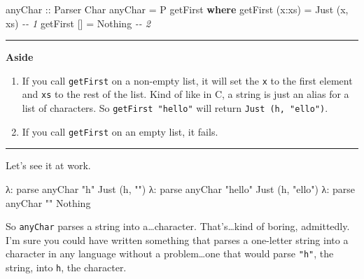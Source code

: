 \documentclass[]{article}
\newenvironment{Shaded}{}{}
\newcommand{\CharTok}[1]{\textcolor[rgb]{0.25,0.44,0.63}{#1}}
\newcommand{\CommentTok}[1]{\textcolor[rgb]{0.38,0.63,0.69}{\textit{#1}}}
\newcommand{\DataTypeTok}[1]{\textcolor[rgb]{0.56,0.13,0.00}{#1}}
\newcommand{\KeywordTok}[1]{\textcolor[rgb]{0.00,0.44,0.13}{\textbf{#1}}}
\newcommand{\NormalTok}[1]{#1}
\newcommand{\OperatorTok}[1]{\textcolor[rgb]{0.40,0.40,0.40}{#1}}
\newcommand{\OtherTok}[1]{\textcolor[rgb]{0.00,0.44,0.13}{#1}}
\newcommand{\StringTok}[1]{\textcolor[rgb]{0.25,0.44,0.63}{#1}}
\begin{document}
\begin{Shaded}
\begin{Highlighting}[]
\OtherTok{anyChar ::} \DataTypeTok{Parser} \DataTypeTok{Char}
\NormalTok{anyChar }\OtherTok{=} \DataTypeTok{P}\NormalTok{ getFirst}
    \KeywordTok{where}
\NormalTok{        getFirst (x}\OperatorTok{:}\NormalTok{xs) }\OtherTok{=} \DataTypeTok{Just}\NormalTok{ (x, xs)          }\CommentTok{{-}{-} 1}
\NormalTok{        getFirst []     }\OtherTok{=} \DataTypeTok{Nothing}               \CommentTok{{-}{-} 2}
\end{Highlighting}
\end{Shaded}

\begin{center}\rule{0.5\linewidth}{0.5pt}\end{center}

\textbf{Aside}

\begin{enumerate}
\def\labelenumi{\arabic{enumi}.}
\tightlist
\item
  If you call \texttt{getFirst} on a non-empty list, it will set the \texttt{x}
  to the first element and \texttt{xs} to the rest of the list. Kind of like in
  C, a string is just an alias for a list of characters. So
  \texttt{getFirst\ "hello"} will return
  \texttt{Just\ (\textquotesingle{}h\textquotesingle{},\ "ello")}.
\item
  If you call \texttt{getFirst} on an empty list, it fails.
\end{enumerate}

\begin{center}\rule{0.5\linewidth}{0.5pt}\end{center}

Let's see it at work.

\begin{Shaded}
\begin{Highlighting}[]
\NormalTok{λ}\OperatorTok{:}\NormalTok{ parse anyChar }\StringTok{"h"}
\DataTypeTok{Just}\NormalTok{ (}\CharTok{\textquotesingle{}h\textquotesingle{}}\NormalTok{, }\StringTok{""}\NormalTok{)}
\NormalTok{λ}\OperatorTok{:}\NormalTok{ parse anyChar }\StringTok{"hello"}
\DataTypeTok{Just}\NormalTok{ (}\CharTok{\textquotesingle{}h\textquotesingle{}}\NormalTok{, }\StringTok{"ello"}\NormalTok{)}
\NormalTok{λ}\OperatorTok{:}\NormalTok{ parse anyChar }\StringTok{""}
\DataTypeTok{Nothing}
\end{Highlighting}
\end{Shaded}

So \texttt{anyChar} parses a string into a\ldots character. That's\ldots kind of
boring, admittedly. I'm sure you could have written something that parses a
one-letter string into a character in any language without a problem\ldots one
that would parse \texttt{"h"}, the string, into
\texttt{\textquotesingle{}h\textquotesingle{}}, the character.
\end{document}
